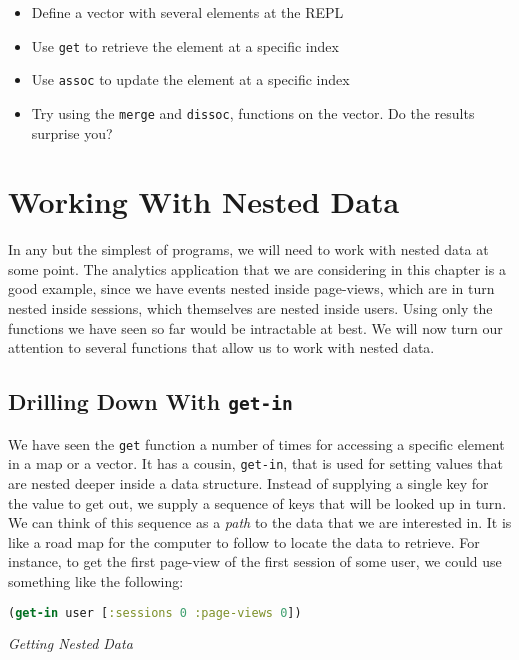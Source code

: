 \documentclass[10pt,twoside,openright]{memoir}
\begin{document}
\begin{itemize}
\tightlist
\item
  Define a vector with several elements at the REPL
\item
  Use \texttt{get} to retrieve the element at a specific index
\item
  Use \texttt{assoc} to update the element at a specific index
\item
  Try using the \texttt{merge} and \texttt{dissoc}, functions on the
  vector. Do the results surprise you?
\end{itemize}


\section{Working With Nested Data}

In any but the simplest of programs, we will need to work with nested
data at some point. The analytics application that we are considering in
this chapter is a good example, since we have events nested inside
page-views, which are in turn nested inside sessions, which themselves
are nested inside users. Using only the functions we have seen so far
would be intractable at best. We will now turn our attention to several
functions that allow us to work with nested data.


\subsection{Drilling Down With \texttt{get-in}}

We have seen the \texttt{get} function a number of times for accessing a
specific element in a map or a vector. It has a cousin, \texttt{get-in},
that is used for setting values that are nested deeper inside a data
structure. Instead of supplying a single key for the value to get out,
we supply a sequence of keys that will be looked up in turn. We can
think of this sequence as a \emph{path} to the data that we are
interested in. It is like a road map for the computer to follow to
locate the data to retrieve. For instance, to get the first page-view of
the first session of some user, we could use something like the
following:

\begin{lstlisting}[language=Clojure]
(get-in user [:sessions 0 :page-views 0])
\end{lstlisting}

\emph{Getting Nested Data}
\end{document}

